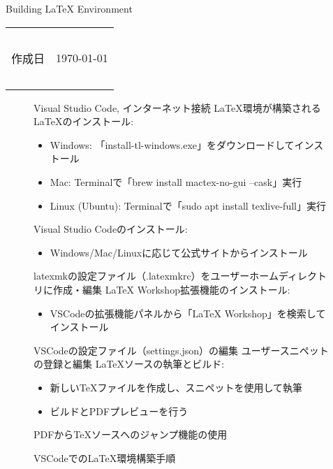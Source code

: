 \documentclass[a4]{jarticle}  %
\theoremstyle{definition}
\begin{document}
\begin{center}
{\Large Building LaTeX Environment}\\
\end{center}
\begin{flushright}
\begin{tabular}{rr}
{\tiny \ } &\ \\
作成日&\today\\
{\tiny \ } &\ \\
\end{tabular}
\end{flushright}

\begin{figure}[htbp]
  \begin{algorithm}[H]
  \caption{VSCodeでのLaTeX環境構築手順}
  \begin{algorithmic}[1]
  \REQUIRE Visual Studio Code, インターネット接続
  \ENSURE LaTeX環境が構築される
  \STATE LaTeXのインストール:
  \begin{itemize}
    \item Windows: 「install-tl-windows.exe」をダウンロードしてインストール
    \item Mac: Terminalで「brew install mactex-no-gui --cask」実行
    \item Linux (Ubuntu): Terminalで「sudo apt install texlive-full」実行
  \end{itemize}
  \STATE Visual Studio Codeのインストール:
  \begin{itemize}
    \item Windows/Mac/Linuxに応じて公式サイトからインストール
  \end{itemize}
  \STATE latexmkの設定ファイル（.latexmkrc）をユーザーホームディレクトリに作成・編集
  \STATE LaTeX Workshop拡張機能のインストール:
  \begin{itemize}
    \item VSCodeの拡張機能パネルから「LaTeX Workshop」を検索してインストール
  \end{itemize}
  \STATE VSCodeの設定ファイル（settings.json）の編集
  \STATE ユーザースニペットの登録と編集
  \STATE LaTeXソースの執筆とビルド:
  \begin{itemize}
    \item 新しいTeXファイルを作成し、スニペットを使用して執筆
    \item ビルドとPDFプレビューを行う
  \end{itemize}
  \STATE PDFからTeXソースへのジャンプ機能の使用
  \end{algorithmic}
  \end{algorithm}
\end{figure}
\end{document}
